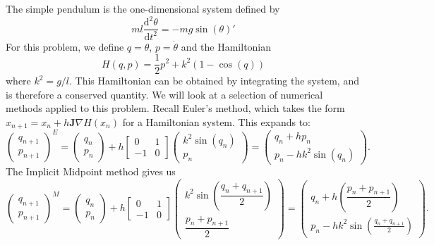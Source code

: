 \documentclass{report}
\theoremstyle{exampstyle} \newtheorem{example}[theorem]{Example}
\theoremstyle{exampstyle} \newtheorem{remark}[theorem]{Remark}
\theoremstyle{exampstyle} \newtheorem{definition}[theorem]{Definition}
\theoremstyle{exampstyle} \newtheorem{lemma}[theorem]{Lemma}
\theoremstyle{exampstyle} \newtheorem{proposition}[theorem]{Proposition}
\begin{document}
The simple pendulum is the one-dimensional system defined by
\begin{equation*}
	ml\frac{\mathrm{d}^2 \theta}{\mathrm{d}t^2} = - mg \sin(\theta)'
\end{equation*}
For this problem, we define $q = \theta$, $p = \dot{\theta}$ and the Hamiltonian
\begin{equation*}
	H(q,p) = \frac{1}{2}p^2 + k^2(1-\cos(q))
\end{equation*}
where $k^2 = g/l$.
This Hamiltonian can be obtained by integrating the system, and is therefore a conserved quantity.
We will look at a selection of numerical methods applied to this problem.
Recall Euler's method, which takes the form $x_{n+1} = x_n + h \mathbf{J} \nabla H(x_n)$ for a Hamiltonian system.
This expands to:
\begin{equation*}
	\begin{pmatrix}
		q_{n+1} \\
		p_{n+1}
	\end{pmatrix}^E = \begin{pmatrix}
		q_n \\
		p_n
	\end{pmatrix} + h \begin{bmatrix}
		0 & 1 \\
		-1 & 0
	\end{bmatrix} \begin{pmatrix}
		k^2 \sin(q_n) \\
		p_n
	\end{pmatrix} = \begin{pmatrix}
		q_n + h p_n \\
		p_n - h k^2 \sin(q_n)
	\end{pmatrix}.
\end{equation*}
The Implicit Midpoint method gives us
\begin{equation*}
	\begin{pmatrix}
		q_{n+1} \\
		p_{n+1}
	\end{pmatrix}^M = \begin{pmatrix}
		q_n \\
		p_n
	\end{pmatrix} + h \begin{bmatrix}
		0 & 1 \\
		-1 & 0
	\end{bmatrix} \begin{pmatrix}
		k^2 \sin \left(\dfrac{q_n + q_{n+1}}{2}\right) \\
		\dfrac{p_n + p_{n+1}}{2}
	\end{pmatrix} = \begin{pmatrix}
		q_n + h \left( \dfrac{p_n + p_{n+1}}{2} \right) \\
		p_n - h k^2 \sin \left( \frac{q_n + q_{n+1}}{2} \right)
	\end{pmatrix}.
\end{equation*}
\end{document}
